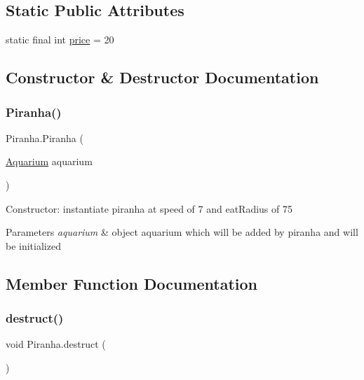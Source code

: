 \subsection*{Static Public Attributes}
\begin{DoxyCompactItemize}
\item 
static final int \mbox{\hyperlink{class_piranha_a4df74b901061840159a8b8e0d5e14f88}{price}} = 20
\end{DoxyCompactItemize}


\subsection{Constructor \& Destructor Documentation}
\mbox{\label{class_piranha_a0d2354ea604a506033fa6fccee6d7be1}} 
\subsubsection{\texorpdfstring{Piranha()}{Piranha()}}
{\footnotesize\ttfamily Piranha.\+Piranha (\begin{DoxyParamCaption}\item[{\mbox{\hyperlink{class_aquarium}{Aquarium}}}]{aquarium }\end{DoxyParamCaption})\hspace{0.3cm}{\ttfamily [inline]}}

Constructor\+: instantiate piranha at speed of 7 and eat\+Radius of 75 
\begin{DoxyParams}{Parameters}
{\em aquarium} & object aquarium which will be added by piranha and will be initialized \\
\hline
\end{DoxyParams}


\subsection{Member Function Documentation}
\mbox{\label{class_piranha_a24179eed654ed9d8a8bc4517ddae3533}} 
\subsubsection{\texorpdfstring{destruct()}{destruct()}}
{\footnotesize\ttfamily void Piranha.\+destruct (\begin{DoxyParamCaption}{ }\end{DoxyParamCaption})\hspace{0.3cm}{\ttfamily [inline]}}

